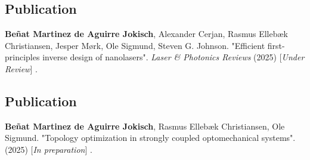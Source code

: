 \begin{center}
  \begin{minipage}{0.9\linewidth}
    \section*{Publication \cite{ownpub4}}
    \textbf{Beñat Martinez de Aguirre Jokisch}, Alexander Cerjan, Rasmus Ellebæk Christiansen, Jesper Mørk, Ole Sigmund, Steven G. Johnson. "Efficient first-principles inverse design of nanolasers". \textit{Laser \& Photonics Reviews} (2025) [\textit{Under Review}] .
  \end{minipage}
\end{center}
\newpage

\cleardoublepage
\vspace*{0.4\textheight}
\begin{center}
  \begin{minipage}{0.9\linewidth}
    \section*{Publication \cite{ownpub5}}
    \textbf{Beñat Martinez de Aguirre Jokisch}, Rasmus Ellebæk Christiansen, Ole Sigmund. "Topology optimization in strongly coupled optomechanical systems". (2025) [\textit{In preparation}] .
  \end{minipage}
\end{center}
\newpage


%

